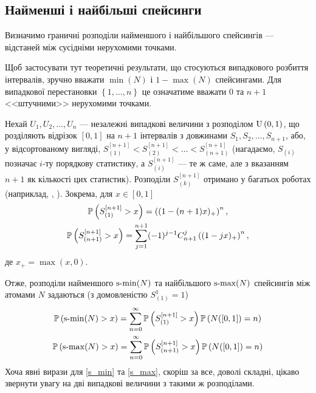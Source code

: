 \subsection{Найменші і найбільші спейсинги}
Визначимо граничні розподіли найменшого і найбільшого спейсингів --- відстаней
між сусідніми нерухомими точками.
\begin{remark}
    Щоб застосувати тут теоретичні результати, що стосуються
    випадкового розбиття інтервалів, зручно вважати
    $\min(N)$ і $1-\max(N)$ спейсингами. Для випадкової
    перестановки $\left\{1, \dots, n\right\}$ це означатиме
    вважати $0$ та $n+1$ <<штучними>> нерухомими точками.
\end{remark}

Нехай $U_1, U_2, \dots, U_{n}$ ---
незалежні випадкові величини
з розподілом $\mathrm{U}\left(0, 1\right)$, що розділяють відрізок $[0, 1]$ на $n+1$
інтервалів з довжинами $S_1, S_2, \dots, S_{n+1}$, або, у відсортованому вигляді, 
$S_{(1)}^{[n+1]} < S_{(2)}^{[n+1]} < \dots < S_{(n+1)}^{[n+1]}$
(нагадаємо, $S_{(i)}$ позначає $i$-ту порядкову статистику, а
$S_{(i)}^{[n+1]}$ --- те ж саме, але з вказанням $n+1$ як кількості цих статистик).
Розподіли $S_{(k)}^{[n+1]}$ отримано у багатьох роботах
(наприклад, \cite{Holst_1980}, \cite{Pinelis_2019}). Зокрема, для $x\in[0,1]$
\begin{gather}
    \label{min_spacing}
    \P{S_{(1)}^{[n+1]} > x} = \left((1-(n+1)x)_+\right)^n, \\
    \label{max_spacing}
    \P{S_{(n+1)}^{[n+1]} > x} = 
    \sum_{j=1}^{n+1} (-1)^{j-1} C_{n+1}^j \left((1-jx)_+\right)^n,
\end{gather}
де $x_+ = \max(x, 0)$.

Отже, розподіли найменшого $\operatorname{s-min}(N)$ та найбільшого $\operatorname{s-max}(N)$ спейсингів 
між атомами $N$ задаються
(з домовленістю $S_{(1)}^{1} = 1$)
\begin{gather}
    \label{s_min}
    \P{\smin(N) > x} = 
    \sum_{n=0}^{\infty} \P{S_{(1)}^{[n+1]} > x} \P{N([0, 1]) = n} \\
    \label{s_max}
    \P{\smax(N) > x} = 
    \sum_{n=0}^{\infty} \P{S_{(n+1)}^{[n+1]} > x} \P{N([0, 1]) = n}
\end{gather}
Хоча явні вирази для \eqref{s_min} та \eqref{s_max},
скоріш за все, доволі складні, цікаво звернути увагу на дві випадкові величини
з такими ж розподілами.

